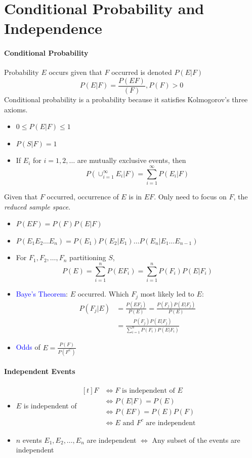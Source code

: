 \section{Conditional Probability and Independence}
\paragraph{Conditional Probability}
Probability \(E\) occurs given that \(F\) occurred is denoted \(P(E|F)\)
\[P(E|F)=\frac{P(EF)}{(F)}, P(F)>0\]
Conditional probability is a probability because it satisfies Kolmogorov's
three axioms.
\begin{itemize}
  \item \( 0\le P(E|F) \le 1 \)
  \item \( P(S|F) = 1 \)
  \item If \( E_i \) for \( i = 1,2,… \) are mutually exclusive events, then
    \[ P(\cup^\infty_{i=1}E_i|F) = \sum_{i=1}^{\infty}P(E_i|F) \]
\end{itemize}
Given that $F$ occurred, occurrence of $E$ is in $EF$. Only need to 
focus on $F$, the \emph{reduced sample space}.
\begin{itemize}
  \item \( P(EF) = P(F) P(E|F) \)
  \item \( P(E_{1}E_{2}…E_{n}) = P(E_{1}) P(E_{2}|E_{1})…P(E_n|E_{1}…E_{n-1})\)
  \item For $F_1,F_2,…,F_n$ partitioning $S$,
    \[ P(E) = \sum_{i=1}^{n} P(EF_i) = \sum_{i=1}^{n} P(F_i) P(E|F_i) \] 
  \item \textcolor{Blue}{Baye's Theorem}: $E$ occurred. Which $F_j$ most likely led to $E$:
    \begin{equation*}
      \begin{split}
        P(F_j|E) & = \frac{P(EF_j)}{P(E)} = \frac{P(F_j)P(E|F_j)}{P(E)}\\
                 & = \frac{P(F_j)P(E|F_j)}{\sum_{i=1}^{n} P(F_i)P(E|F_i)}
      \end{split}
    \end{equation*}
  \item \textcolor{Blue}{Odds} of $E=\frac{P(F)}{P(F^C)}$
\end{itemize}
\paragraph{Independent Events}
\begin{itemize}
  \item \(E\) is independent of
    $\begin{aligned}[t]
      F&\iff F \text{\ is independent of } E\\
       &\iff P(E|F) = P(E)\\
       &\iff P(EF)=P(E)P(F)\\
       &\iff E\text{\ and }F^c\text{\ are independent}
    \end{aligned}$
  \item $n$ events $E_1,E_2,\ldots,E_n$ are independent $\iff$ Any subset of
    the events are independent
\end{itemize}
